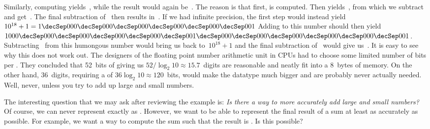 Similarly, computing  yields~, while the  result would again be~.
The reason is that first,  is computed.
Then  yields~, from which we subtract~ and get~.
The final subtraction of~ then results in~.
If we had infinite precision, the first step would instead yield~$10^{18}+1=1\decSep000\decSep000\decSep000\decSep000\decSep000\decSep001$
Adding  to this number should then yield~$1000\decSep000\decSep000\decSep000\decSep000\decSep001\decSep000\decSep000\decSep000\decSep000\decSep000\decSep001$.
Subtracting~ from this humongous number would bring us back to~$10^{18}+1$ and the final subtraction of~ would give us~.
It is easy to see why this does not work out.
The designers of the floating point number arithmetic unit in CPUs had to choose some limited number of bits per .
They concluded that 52~bits of  giving us $52/\log_2 10\approx 15.7$~digits are reasonable and neatly fit into a 8~bytes of memory.
On the other hand, 36~digits, requiring a  of $36\log_2 10\approx 120$~bits, would make the datatype much bigger and are probably never actually needed.
Well, never, unless you try to add up large and small numbers.

The interesting question that we may ask after reviewing the example is:
\emph{Is there a way to more accurately add large and small numbers?}
Of course, we can never represent  exactly as .
However, we want to be able to represent the final result of a sum at least as accurately as possible.
For example, we want a way to compute the sum  such that the result is .
Is this possible?

